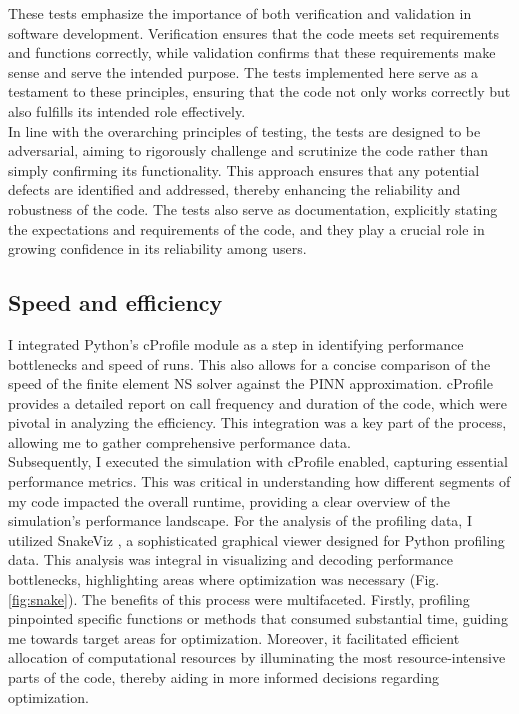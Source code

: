 These tests emphasize the importance of both verification and validation in software development. Verification ensures that the code meets set requirements and functions correctly, while validation confirms that these requirements make sense and serve the intended purpose. The tests implemented here serve as a testament to these principles, ensuring that the code not only works correctly but also fulfills its intended role effectively.
\\

In line with the overarching principles of testing, the tests are designed to be adversarial, aiming to rigorously challenge and scrutinize the code rather than simply confirming its functionality. This approach ensures that any potential defects are identified and addressed, thereby enhancing the reliability and robustness of the code. The tests also serve as documentation, explicitly stating the expectations and requirements of the code, and they play a crucial role in growing confidence in its reliability among users.

\subsection{Speed and efficiency}

I integrated Python's cProfile \cite{cprofile} module as a step in identifying performance bottlenecks and speed of runs.
This also allows for a concise comparison of the speed of the finite element NS solver against the PINN approximation. cProfile provides a detailed report on call frequency and duration of the code, which were pivotal in analyzing the efficiency. This integration was a key part of the process, allowing me to gather comprehensive performance data.
\\

Subsequently, I executed the simulation with cProfile enabled, capturing essential performance metrics. This was critical in understanding how different segments of my code impacted the overall runtime, providing a clear overview of the simulation's performance landscape. For the analysis of the profiling data, I utilized SnakeViz \cite{snakeviz}, a sophisticated graphical viewer designed for Python profiling data. This analysis was integral in visualizing and decoding performance bottlenecks, highlighting areas where optimization was necessary (Fig. \ref{fig:snake}). The benefits of this process were multifaceted. Firstly, profiling pinpointed specific functions or methods that consumed substantial time, guiding me towards target areas for optimization. Moreover, it facilitated efficient allocation of computational resources by illuminating the most resource-intensive parts of the code, thereby aiding in more informed decisions regarding optimization.
\\

